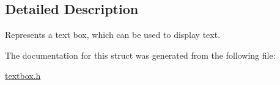 \subsection{Detailed Description}
Represents a text box, which can be used to display text. 

The documentation for this struct was generated from the following file\+:\begin{DoxyCompactItemize}
\item 
\mbox{\hyperlink{textbox_8h}{textbox.\+h}}\end{DoxyCompactItemize}
